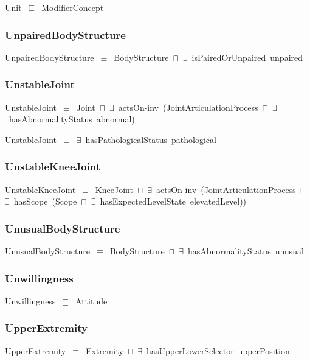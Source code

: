 \documentclass{article}
\begin{document}
Unit~\ensuremath{\sqsubseteq}~ModifierConcept~

\subsubsection*{UnpairedBodyStructure}

UnpairedBodyStructure~\ensuremath{\equiv}~BodyStructure~\ensuremath{\sqcap}~\ensuremath{\exists}~isPairedOrUnpaired~unpaired

\subsubsection*{UnstableJoint}

UnstableJoint~\ensuremath{\equiv}~Joint~\ensuremath{\sqcap}~\ensuremath{\exists}~actsOn-inv~(JointArticulationProcess~\ensuremath{\sqcap}~\ensuremath{\exists}~hasAbnormalityStatus~abnormal)

UnstableJoint~\ensuremath{\sqsubseteq}~\ensuremath{\exists}~hasPathologicalStatus~pathological~

\subsubsection*{UnstableKneeJoint}

UnstableKneeJoint~\ensuremath{\equiv}~KneeJoint~\ensuremath{\sqcap}~\ensuremath{\exists}~actsOn-inv~(JointArticulationProcess~\ensuremath{\sqcap}~\ensuremath{\exists}~hasScope~(Scope~\ensuremath{\sqcap}~\ensuremath{\exists}~hasExpectedLevelState~elevatedLevel))

\subsubsection*{UnusualBodyStructure}

UnusualBodyStructure~\ensuremath{\equiv}~BodyStructure~\ensuremath{\sqcap}~\ensuremath{\exists}~hasAbnormalityStatus~unusual

\subsubsection*{Unwillingness}

Unwillingness~\ensuremath{\sqsubseteq}~Attitude~

\subsubsection*{UpperExtremity}

UpperExtremity~\ensuremath{\equiv}~Extremity~\ensuremath{\sqcap}~\ensuremath{\exists}~hasUpperLowerSelector~upperPosition
\end{document}
